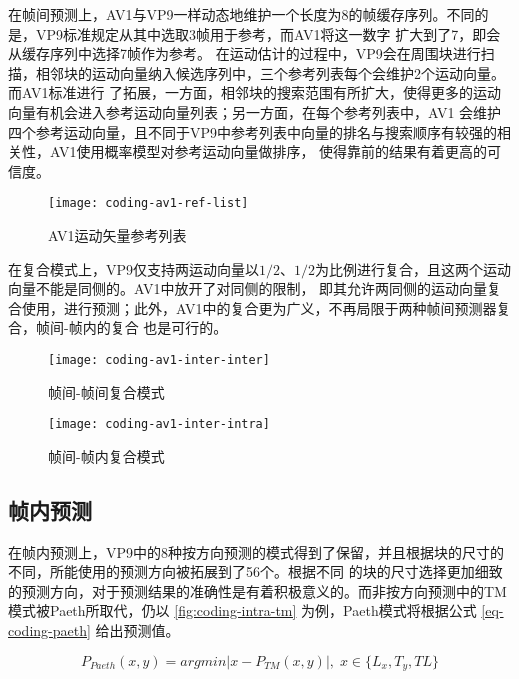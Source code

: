在帧间预测上，AV1与VP9一样动态地维护一个长度为8的帧缓存序列。不同的是，VP9标准规定从其中选取3帧用于参考，而AV1将这一数字
扩大到了7，即会从缓存序列中选择7帧作为参考。
在运动估计的过程中，VP9会在周围块进行扫描，相邻块的运动向量纳入候选序列中，三个参考列表每个会维护2个运动向量。而AV1标准进行
了拓展，一方面，相邻块的搜索范围有所扩大，使得更多的运动向量有机会进入参考运动向量列表；另一方面，在每个参考列表中，AV1
会维护四个参考运动向量，且不同于VP9中参考列表中向量的排名与搜索顺序有较强的相关性，AV1使用概率模型对参考运动向量做排序，
使得靠前的结果有着更高的可信度。

\begin{figure}[H] %
  \centering
  \texttt{[image: coding-av1-ref-list]}
  \caption{AV1运动矢量参考列表}
  \label{fig:coding-av1-ref-list}
\end{figure}

在复合模式上，VP9仅支持两运动向量以$1/2$、$1/2$为比例进行复合，且这两个运动向量不能是同侧的。AV1中放开了对同侧的限制，
即其允许两同侧的运动向量复合使用，进行预测；此外，AV1中的复合更为广义，不再局限于两种帧间预测器复合，帧间-帧内的复合
也是可行的。

\begin{figure}[H] %
  \centering
  \texttt{[image: coding-av1-inter-inter]}
  \caption{帧间-帧间复合模式}
\end{figure}

\begin{figure}[H] %
  \centering
  \texttt{[image: coding-av1-inter-intra]}
  \caption{帧间-帧内复合模式}
\end{figure}


\subsection{帧内预测}

在帧内预测上，VP9中的8种按方向预测的模式得到了保留，并且根据块的尺寸的不同，所能使用的预测方向被拓展到了56个。根据不同
的块的尺寸选择更加细致的预测方向，对于预测结果的准确性是有着积极意义的。而非按方向预测中的TM模式被Paeth所取代，仍以
\ref{fig:coding-intra-tm} 为例，Paeth模式将根据公式 \ref{eq-coding-paeth} 给出预测值。

\begin{equation}
\label{eq-coding-paeth}
P_{Paeth}(x, y) = argmin|x-P_{TM}(x,y)|, \; x \in \{L_x,T_y,TL\}
\end{equation}

